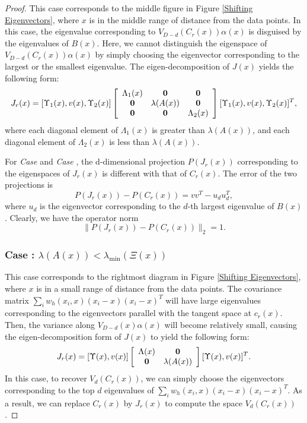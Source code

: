 \documentclass[aos,preprint]{imsart}
\theoremstyle{remark}
\begin{document}
\begin{appendix}
\begin{proof}
This case corresponds to the middle figure in {Figure \ref{Shifting Eigenvectors}}, where $x$ is in the middle range of distance from the data points. In this case, the eigenvalue corresponding to $V_{D-d}(C_r(x))\alpha(x)$ is disguised by the eigenvalues of $B(x)$. Here, we cannot distinguish the eigenspace of $V_{D-d}(C_r(x))\alpha(x)$ by simply choosing the eigenvector corresponding to the largest or the smallest eigenvalue. The eigen-decomposition of $J(x)$ yields the following form:
\begin{equation}\label{SVD2}
J_r (x)= [\Upsilon_1(x), v(x), \Upsilon_2(x)] 
\left[
\begin{array}{ccc}
\Lambda_1(x) & \bf 0 & \bf 0\\
\bf 0 &\lambda(A(x)) &\bf 0 \\
\bf 0 &\bf 0  &\Lambda_2(x) \\
\end{array}
\right][\Upsilon_1(x), v(x), \Upsilon_2(x)]^T,
\end{equation}
where each diagonal element of $\Lambda_1(x)$ is greater than $\lambda(A(x))$, and each diagonal element of $\Lambda_2(x)$ is less than $\lambda(A(x))$.

For {\it Case {}} and {\it Case },  the d-dimensional projection $P(J_r(x))$ corresponding to the eigenspaces of $J_r(x)$ is different with that of $C_r(x)$. The error of the two projections is
\[
P(J_r(x)) - P(C_r(x)) = v v^T - u_du_d^T,
\]
where $u_d$ is the eigenvector corresponding to the $d$-th largest eigenvalue of $B(x)$. Clearly, we have the operator norm
\[
\| P(J_r(x)) - P(C_r(x)) \|_2 = 1.
\]

\subsubsection*{Case : $\lambda(A(x))<\lambda_{\min} (\Xi(x))$ }

This case corresponds to the rightmost diagram in {Figure \ref{Shifting Eigenvectors}}, where $x$ is in a small range of distance from the data points. The covariance matrix $\sum_i w_h(x_i, x)(x_i-x)(x_i-x)^T$ will have large eigenvalues corresponding to the eigenvectors parallel with the tangent space at $c_r(x)$. Then, the variance along $V_{D-d}(x)\alpha(x)$ will become relatively small, causing the eigen-decomposition form of $J(x)$ to yield the following form:
\begin{equation}\label{SVD3}
J_r (x)= [\Upsilon(x),v(x)] 
\left[
\begin{array}{cc}
\Lambda(x) & \bf 0\\
\bf 0 &\lambda(A(x))
\end{array}
\right][\Upsilon(x), v(x)]^T.
\end{equation}
In this case, to recover $V_d(C_r(x))$, we can simply choose the eigenvectors corresponding to the top $d$ eigenvalues of $\sum_i w_h(x_i, x)(x_i-x)(x_i-x)^T$. As a result, we can replace $C_r(x)$ by $J_r(x)$ to compute the space $V_d(C_r(x))$.


\end{proof}
\end{appendix}
\end{document}
